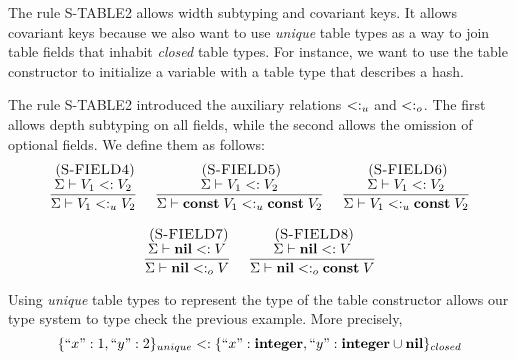 The rule \textsc{S-TABLE2} allows width subtyping and covariant keys.
It allows covariant keys because we also want to use \emph{unique}
table types as a way to join table fields that inhabit \emph{closed} table types.
For instance, we want to use the table constructor to initialize
a variable with a table type that describes a hash.

The rule \textsc{S-TABLE2} introduced the auxiliary relations
$<:_{u}$ and $<:_{o}$.
The first allows depth subtyping on all fields,
while the second allows the omission of optional fields.
We define them as follows:
\[
\begin{array}{c}
\begin{array}{c}
\; (\textsc{S-FIELD4})\\
\dfrac{\Sigma \vdash V_{1} <: V_{2}}
      {\Sigma \vdash V_{1} <:_{u} V_{2}}
\end{array}
\;
\begin{array}{c}
\; (\textsc{S-FIELD5})\\
\dfrac{\Sigma \vdash V_{1} <: V_{2}}
      {\Sigma \vdash \mathbf{const} \; V_{1} <:_{u} \mathbf{const} \; V_{2}}
\end{array}
\;
\begin{array}{c}
\; (\textsc{S-FIELD6})\\
\dfrac{\Sigma \vdash V_{1} <: V_{2}}
      {\Sigma \vdash V_{1} <:_{u} \mathbf{const} \; V_{2}}
\end{array}
\\ \\
\begin{array}{c}
\; (\textsc{S-FIELD7})\\
\dfrac{\Sigma \vdash \mathbf{nil} <: V}
      {\Sigma \vdash \mathbf{nil} <:_{o} V}
\end{array}
\;
\begin{array}{c}
\; (\textsc{S-FIELD8})\\
\dfrac{\Sigma \vdash \mathbf{nil} <: V}
      {\Sigma \vdash \mathbf{nil} <:_{o} \mathbf{const} \; V}
\end{array}
\end{array}
\]

Using \emph{unique} table types to represent the type of the table
constructor allows our type system to type check the previous example.
More precisely,
\[
\{``x":1, ``y":2\}_{unique} <: \{``x":\mathbf{integer}, ``y":\mathbf{integer} \cup \mathbf{nil}\}_{closed}
\]

